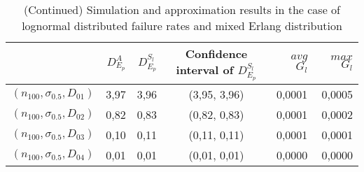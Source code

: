 \documentclass[preprint,12pt]{elsarticle}
\begin{document}
\begin{appendices}

\begin{table}[htbp]
  \centering
  \caption{(Continued) Simulation and approximation results in the case of lognormal distributed failure rates and mixed Erlang distribution}
    \begin{tabular}{rrrcrr}
    \toprule
          & $D_{E_{p}}^{A}$ & $D_{E_{p}}^{S_{l}}$ & Confidence interval of $D_{E_{p}}^{S_{l}}$ & $avg$ $G_{l}$ & $max$ $G_{l}$ \\
    \midrule
     $(n_{100},\sigma_{0.5},D_{01})$ & 3,97  & 3,96  & (3,95, 3,96) & 0,0001 & 0,0005 \\
    $(n_{100},\sigma_{0.5},D_{02})$ & 0,82  & 0,83  & (0,82, 0,83) & 0,0001 & 0,0002 \\
    $(n_{100},\sigma_{0.5},D_{03})$& 0,10  & 0,11  & (0,11, 0,11) & 0,0001 & 0,0001 \\
    $(n_{100},\sigma_{0.5},D_{04})$ & 0,01  & 0,01  & (0,01, 0,01) & 0,0000 & 0,0000 \\
    \bottomrule
    \end{tabular}%
  \label{lognormal2}%
\end{table}%



\end{appendices}
\end{document}

